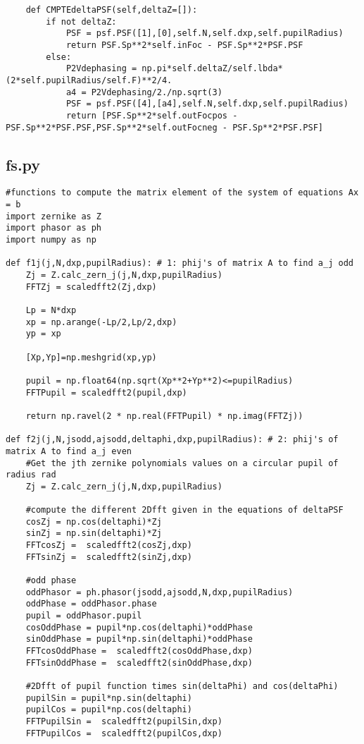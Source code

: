 \begin{lstlisting}
    def CMPTEdeltaPSF(self,deltaZ=[]):
        if not deltaZ:
            PSF = psf.PSF([1],[0],self.N,self.dxp,self.pupilRadius)
            return PSF.Sp**2*self.inFoc - PSF.Sp**2*PSF.PSF
        else:
            P2Vdephasing = np.pi*self.deltaZ/self.lbda*(2*self.pupilRadius/self.F)**2/4.
            a4 = P2Vdephasing/2./np.sqrt(3)
            PSF = psf.PSF([4],[a4],self.N,self.dxp,self.pupilRadius)
            return [PSF.Sp**2*self.outFocpos - PSF.Sp**2*PSF.PSF,PSF.Sp**2*self.outFocneg - PSF.Sp**2*PSF.PSF]
\end{lstlisting}

\subsection{fs.py}
\label{subapp:fs}
\begin{lstlisting}
#functions to compute the matrix element of the system of equations Ax = b
import zernike as Z
import phasor as ph
import numpy as np

def f1j(j,N,dxp,pupilRadius): # 1: phij's of matrix A to find a_j odd
    Zj = Z.calc_zern_j(j,N,dxp,pupilRadius)
    FFTZj = scaledfft2(Zj,dxp)

    Lp = N*dxp
    xp = np.arange(-Lp/2,Lp/2,dxp)
    yp = xp

    [Xp,Yp]=np.meshgrid(xp,yp)
    
    pupil = np.float64(np.sqrt(Xp**2+Yp**2)<=pupilRadius)
    FFTPupil = scaledfft2(pupil,dxp)

    return np.ravel(2 * np.real(FFTPupil) * np.imag(FFTZj))

def f2j(j,N,jsodd,ajsodd,deltaphi,dxp,pupilRadius): # 2: phij's of matrix A to find a_j even
    #Get the jth zernike polynomials values on a circular pupil of radius rad
    Zj = Z.calc_zern_j(j,N,dxp,pupilRadius)

    #compute the different 2Dfft given in the equations of deltaPSF
    cosZj = np.cos(deltaphi)*Zj
    sinZj = np.sin(deltaphi)*Zj
    FFTcosZj =  scaledfft2(cosZj,dxp)
    FFTsinZj =  scaledfft2(sinZj,dxp)

    #odd phase
    oddPhasor = ph.phasor(jsodd,ajsodd,N,dxp,pupilRadius)
    oddPhase = oddPhasor.phase
    pupil = oddPhasor.pupil
    cosOddPhase = pupil*np.cos(deltaphi)*oddPhase
    sinOddPhase = pupil*np.sin(deltaphi)*oddPhase
    FFTcosOddPhase =  scaledfft2(cosOddPhase,dxp)
    FFTsinOddPhase =  scaledfft2(sinOddPhase,dxp)

    #2Dfft of pupil function times sin(deltaPhi) and cos(deltaPhi)
    pupilSin = pupil*np.sin(deltaphi)
    pupilCos = pupil*np.cos(deltaphi)
    FFTPupilSin =  scaledfft2(pupilSin,dxp)
    FFTPupilCos =  scaledfft2(pupilCos,dxp)


\end{lstlisting}
